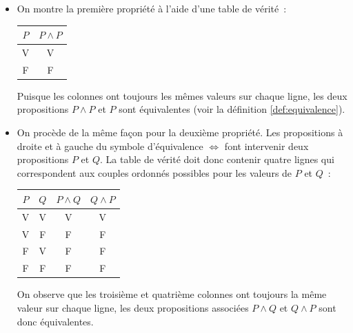 \documentclass[10pt,notheorems]{beamer}
\theoremstyle{plain}
\theoremstyle{definition} %
\begin{document}
  \begin{notes}
    \begin{itemize}

    \item On montre la première propriété à l'aide d'une table de
      vérité~:
      \begin{table}
        \centering
        \begin{tabular}[H]{|c|c|}
          \hline
          $P$ & $P \land P$ \\ \hline
          V & V \\
          F & F \\
          \hline\hline
        \end{tabular}
      \end{table}
      Puisque les colonnes ont toujours les mêmes valeurs sur chaque
      ligne, les deux propositions $P\land P$ et $P$ sont équivalentes
      (voir la définition \hyperlink{slide_equivalence_logique_1}{\ref{def:equivalence}}).

    \item On procède de la même façon pour la deuxième propriété. Les
      propositions à droite et à gauche du symbole d'équivalence
      $\Leftrightarrow$ font intervenir deux propositions $P$ et
      $Q$. La table de vérité doit donc contenir quatre lignes qui
      correspondent aux couples ordonnés possibles pour les
      valeurs de $P$ et $Q$~:
      \begin{table}[H]
        \centering
        \begin{tabular}[H]{|cc|cc|}
          \hline
          $P$ & $Q$ & $P \land Q$ & $Q \land P$\\ \hline
          V & V & V & V\\
          V & F & F & F\\
          F & V & F & F\\
          F & F & F & F \\
          \hline\hline
        \end{tabular}
      \end{table}
      On observe que les troisième et quatrième colonnes ont toujours
      la même valeur sur chaque ligne, les deux propositions associées
      $P \land Q$ et $Q \land P$ sont donc
      équivalentes.


\end{itemize}
\end{notes}
\end{document}
